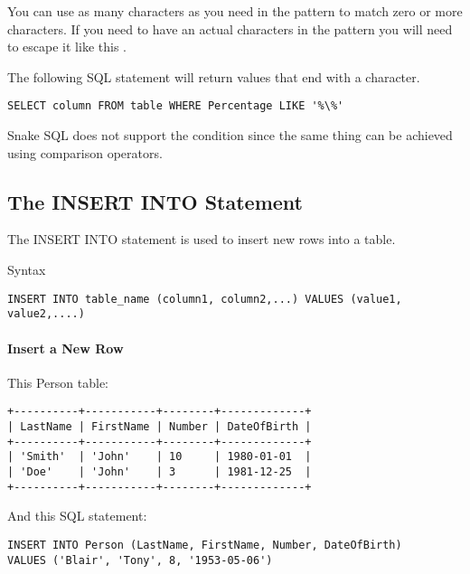 \documentclass{howto}
\begin{document}
You can use as many \code{\%} characters as you need in the pattern to match zero or more characters. If you need to have an actual \code{\%} characters in the pattern you will need to escape it like this \code{\\\%}.

The following SQL statement will return values that end with a \code{\%} character.

\begin{verbatim}
SELECT column FROM table WHERE Percentage LIKE '%\%'
\end{verbatim}


Snake SQL does not support the  condition since the same thing can be achieved using comparison operators.

\subsection{The INSERT INTO Statement}

The INSERT INTO statement is used to insert new rows into a table.

Syntax
\begin{verbatim}
INSERT INTO table_name (column1, column2,...) VALUES (value1, value2,....)
\end{verbatim}

\paragraph{Insert a New Row}

This Person table:
\begin{verbatim}
+----------+-----------+--------+-------------+
| LastName | FirstName | Number | DateOfBirth |
+----------+-----------+--------+-------------+
| 'Smith'  | 'John'    | 10     | 1980-01-01  |
| 'Doe'    | 'John'    | 3      | 1981-12-25  |
+----------+-----------+--------+-------------+
\end{verbatim}

And this SQL statement:
\begin{verbatim}
INSERT INTO Person (LastName, FirstName, Number, DateOfBirth)
VALUES ('Blair', 'Tony', 8, '1953-05-06')
\end{verbatim}
\end{document}
